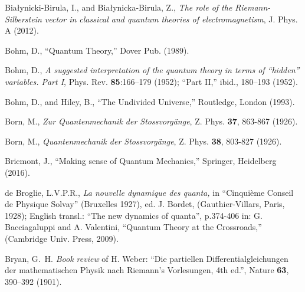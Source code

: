 \documentclass[11pt]{article}
\theoremstyle{definition}
\numberwithin{equation}{section}
\begin{document}
\begin{thebibliography}{[KTZ2020]}
        Bia{\l}ynicki-Birula, I., and  Bia{\l}ynicka-Birula, Z.,
        \textit{The role of the Riemann-Silberstein vector in classical and quantum theories of electromagnetism},
        J. Phys. A \textbf{} (2012).%

        Bohm, D.,
        ``Quantum Theory,''
        Dover Pub. (1989).\vspace{-4pt}

	Bohm, D.,
		\textit{A suggested interpretation of the quantum theory in terms of ``hidden'' variables. Part I},
	{Phys. Rev.} \textbf{85}:166--179 (1952);
	         ``Part II,''
	{ibid.}, 180--193 (1952).

        Bohm, D.,
        and 
        Hiley, B.,
        ``{The Undivided Universe},''
        Routledge, London (1993).

        Born, M.,
                 {\it Zur Quantenmechanik der Stossvorg\"ange},
        Z. Phys. {\textbf{37}},  863-867 (1926).%

        Born, M.,
                 {\it Quantenmechanik der Stossvorg\"ange},
        Z. Phys. {\textbf{38}},  803-827 (1926).%

        Bricmont, J.,
                 ``{Making sense of Quantum Mechanics},''
        Springer, Heidelberg (2016).%

        de Broglie, L.V.P.R.,
        \textit{La nouvelle dynamique des quanta,}
        in ``{Cinqui\`eme Conseil de Physique Solvay}'' (Bruxelles 1927),
        ed. J. Bordet, (Gauthier-Villars, Paris, 1928); 
        English transl.: ``The new dynamics of quanta'', p.374-406 in:
        G. Bacciagaluppi and A. Valentini,
        ``{Quantum Theory at the Crossroads},'' (Cambridge Univ. Press, 2009).  %

 Bryan, G.~H. %
  \textit{Book review} of H. Weber: ``Die partiellen Differentialgleichungen der mathematischen Physik nach Riemann's Vorlesungen,
    4th ed.'', 
    Nature \textbf{63}, 390--392 (1901). \vspace{-4pt} %


\end{thebibliography}
\end{document}
